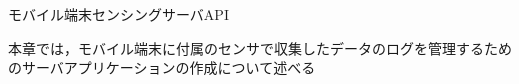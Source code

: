 \chapterhead
{モバイル端末センシングサーバAPI}

{本章では，モバイル端末に付属のセンサで収集したデータのログを管理するためのサーバアプリケーションの作成について述べる}





\newpage
